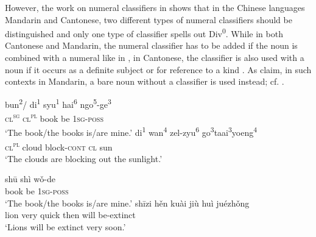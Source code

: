 \documentclass[output=paper,colorlinks,citecolor=brown,
]{langscibook}
\begin{document}
However, the work on numeral classifiers in \citet{ChengSybesma2014} shows that in the Chinese languages Mandarin and Cantonese, two different types of numeral classifiers should be distinguished and only one type of classifier spells out Div\textsuperscript{0}. While in both Cantonese and Mandarin, the numeral classifier has to be added if the noun is combined with a numeral like in , in Cantonese, the classifier is also used with a noun if it occurs as a definite subject  or for reference to a kind . As \citet{ChengSybesma2014} claim, in such contexts in Mandarin, a bare noun without a classifier is used instead; cf. . 

\ea\label{ex:3}
\ea
\gll bun\textsuperscript{2}/ di\textsuperscript{1} syu\textsuperscript{1}  hai\textsuperscript{6}   ngo\textsuperscript{5}-ge\textsuperscript{3} \\
\textsc{cl}\textsuperscript{\textsc{sg}} \textsc{cl}\textsuperscript{\textsc{pl}} book be \textsc{1sg-poss} \\ 
\glt `The book/the books is/are mine.'
\label{ex:3a}
\ex \gll di\textsuperscript{1} wan\textsuperscript{4} zel-zyu\textsuperscript{6}  go\textsuperscript{3}taai\textsuperscript{3}yoeng\textsuperscript{4} \\
\textsc{cl}\textsuperscript{\textsc{pl}} cloud block-\textsc{cont} {\textsc{cl} sun} \\
\glt `The clouds are blocking out the sunlight.' \\ \hfill \citep[Cantonese;][253]{ChengSybesma2014}
\label{ex:3b}
\z\z
  
\ea\label{ex:4}
\ea
\gll shū shì wǒ-de \\
book be \textsc{1sg-poss} \\ 
\glt `The book/the books is/are mine.'
\label{ex:4a}
\ex
\gll shīzi hěn kuài jiù huì juézhǒng \\
lion very quick then will be-extinct \\
\glt `Lions will be extinct very soon.' \\\hfill \citep[Mandarin;][252]{ChengSybesma2014}
\label{ex:4b}
\z\z
\end{document}
